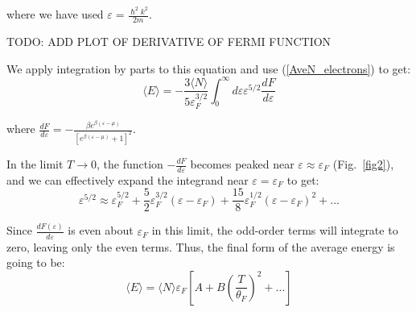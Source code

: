 \documentclass[book.tex]{subfiles}
\begin{document}
\noindent where we have used $\varepsilon = \frac{\hslash^2 k^2}{2m}$.

TODO: ADD PLOT OF DERIVATIVE OF FERMI FUNCTION


We apply integration by parts to this equation and use (\ref{AveN_electrons}) to get:
\begin{equation}\label{Eq13}
\langle E \rangle = - \frac{3\langle N \rangle}{5\varepsilon_F^{3/2}} \int_0^{\infty} d\varepsilon \varepsilon^{5/2} \frac{dF}{d\varepsilon}
\end{equation}

\noindent where $\frac{dF}{d\varepsilon} = -\frac{\beta e^{\beta (\varepsilon - \mu)}}{[e^{\beta (\varepsilon - \mu)} + 1]^2}$.

In the limit $T\rightarrow0$, the function $-\frac{dF}{d\varepsilon}$ becomes peaked near $\varepsilon \approx \varepsilon_F$  (Fig.~\ref{fig2}), and we can effectively expand the integrand near $\varepsilon = \varepsilon_F$  to get:
\begin{equation*}
\varepsilon^{5/2} \approx \varepsilon_F^{5/2} + \frac{5}{2}\varepsilon_F^{3/2}(\varepsilon - \varepsilon_F) + \frac{15}{8}\varepsilon_F^{1/2}(\varepsilon - \varepsilon_F)^2 + ...
\end{equation*}
 


Since $\frac{dF(\varepsilon)}{d\varepsilon}$ is even about $\varepsilon_F$ in this limit, the odd-order terms will integrate to zero, leaving only the even terms. Thus, the final form of the average energy is going to be:
\begin{equation}\label{Eq14}
\langle E \rangle = \langle N \rangle \varepsilon_F \left[A +B\left(\frac{T}{\theta_F}\right)^2 +...\right]
\end{equation}
\end{document}
